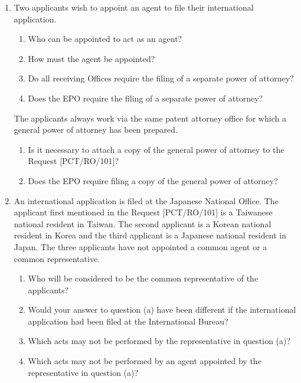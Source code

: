\documentclass{report}
\begin{document}
\begin{enumerate}[label=\textbf{Question \arabic*}]

    \item %
    Two applicants wish to appoint an agent to file their international application.
    \begin{enumerate}[label=(\alph*)]
        \item Who can be appointed to act as an agent?
        \item How must the agent be appointed?
        \item Do all receiving Offices require the filing of a separate power of attorney?
        \item Does the EPO require the filing of a separate power of attorney?
    \end{enumerate}
    
    \vspace{1em} %
    The applicants always work via the same patent attorney office for which a general power of attorney has been prepared.
    
    \begin{enumerate}[label=(\alph*), resume]
        \item Is it necessary to attach a copy of the general power of attorney to the Request [PCT/RO/101]?
        \item Does the EPO require filing a copy of the general power of attorney?
    \end{enumerate}

    \item %
    An international application is filed at the Japanese National Office. The applicant first mentioned in the Request [PCT/RO/101] is a Taiwanese national resident in Taiwan. The second applicant is a Korean national resident in Korea and the third applicant is a Japanese national resident in Japan. The three applicants have not appointed a common agent or a common representative.
    \begin{enumerate}[label=(\alph*)]
        \item Who will be considered to be the common representative of the applicants?
        \item Would your answer to question (a) have been different if the international application had been filed at the International Bureau?
        \item Which acts may not be performed by the representative in question (a)?
        \item Which acts may not be performed by an agent appointed by the representative in question (a)?
    \end{enumerate}


\end{enumerate}
\end{document}
